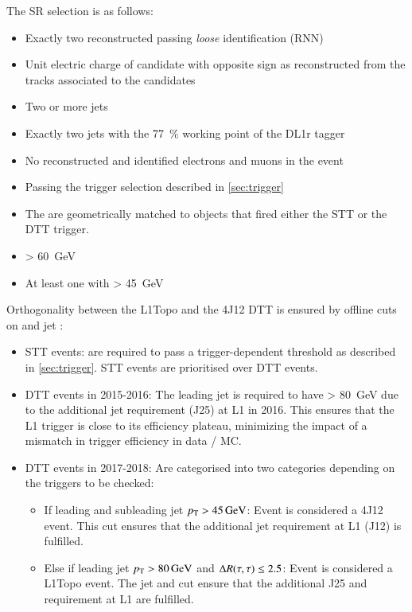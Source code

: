 The SR selection is as follows:
\begin{itemize}
\item Exactly two reconstructed \tauhadvis passing \textit{loose} identification
  (RNN)

\item Unit electric charge of \tauhadvis candidate with opposite sign as
  reconstructed from the tracks associated to the \tauhadvis candidates

\item Two or more jets

\item Exactly two \btagged jets with the \SI{77}{\percent} working point of the
  DL1r tagger

\item No reconstructed and identified electrons and muons in the event

\item Passing the trigger selection described in \cref{sec:trigger}

\item The \tauhadvis are geometrically matched to objects that fired either the
  STT or the DTT trigger.

\item \mMMC > \SI{60}{\GeV}

\item At least one \bjet with \pT > \SI{45}{\GeV} 
\end{itemize}


Orthogonality between the L1Topo and the 4J12 DTT is ensured by offline cuts on
\tauhadvis and jet \pT:
\begin{itemize}
\item STT events: \tauhadvis are required to pass a trigger-dependent \pT
  threshold as described in \cref{sec:trigger}. STT events are prioritised over
  DTT events.

\item DTT events in 2015-2016: The leading jet is required to have \pT >
  \SI{80}{\GeV} due to the additional jet requirement (J25) at L1 in 2016. This
  ensures that the L1 trigger is close to its efficiency plateau, minimizing the
  impact of a mismatch in trigger efficiency in data / MC.

\item DTT events in 2017-2018: Are categorised into two categories depending on
  the triggers to be checked:
  \begin{itemize}
  \item If leading and subleading jet $p_{\text{T}} > \SI{45}{\ensuremath{\text{GeV}}}$: Event is considered a
    4J12 event. This cut ensures that the additional jet requirement at L1 (J12)
    is fulfilled.
  \item Else if leading jet $\pT > \SI{80}{\GeV}$ and $\Delta R(\tau, \tau) \leq 2.5$:
    Event is considered a L1Topo event. The jet \pT and \dRtautau cut ensure
    that the additional J25 and \dRtautau requirement at L1 are fulfilled.
  \end{itemize}
\end{itemize}


